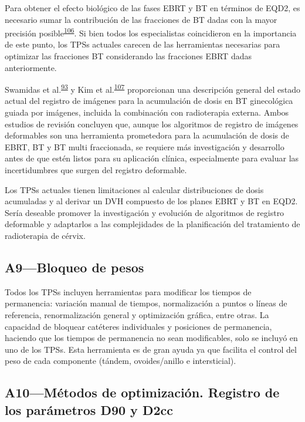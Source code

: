 \documentclass[
  a4paper,
]{scrreprt}
\begin{document}
Para obtener el efecto biológico de las fases EBRT y BT en términos de
EQD2, es necesario sumar la contribución de las fracciones de BT dadas
con la mayor precisión
posible\textsuperscript{\protect\hyperlink{ref-kessler2006}{106}}. Si
bien todos los especialistas coincidieron en la importancia de este
punto, los TPSs actuales carecen de las herramientas necesarias para
optimizar las fracciones BT considerando las fracciones EBRT dadas
anteriormente.

Swamidas et
al.\textsuperscript{\protect\hyperlink{ref-swamidas2020}{93}} y Kim et
al.\textsuperscript{\protect\hyperlink{ref-kim2021}{107}} proporcionan
una descripción general del estado actual del registro de imágenes para
la acumulación de dosis en BT ginecológica guiada por imágenes, incluida
la combinación con radioterapia externa. Ambos estudios de revisión
concluyen que, aunque los algoritmos de registro de imágenes deformables
son una herramienta prometedora para la acumulación de dosis de EBRT, BT
y BT multi fraccionada, se requiere más investigación y desarrollo antes
de que estén listos para su aplicación clínica, especialmente para
evaluar las incertidumbres que surgen del registro deformable.

Los TPSs actuales tienen limitaciones al calcular distribuciones de
dosis acumuladas y al derivar un DVH compuesto de los planes EBRT y BT
en EQD2. Sería deseable promover la investigación y evolución de
algoritmos de registro deformable y adaptarlos a las complejidades de la
planificación del tratamiento de radioterapia de cérvix.

\hypertarget{sec-a9}{%
\subsection{A9---Bloqueo de pesos}\label{sec-a9}}

Todos los TPSs incluyen herramientas para modificar los tiempos de
permanencia: variación manual de tiempos, normalización a puntos o
líneas de referencia, renormalización general y optimización gráfica,
entre otras. La capacidad de bloquear catéteres individuales y
posiciones de permanencia, haciendo que los tiempos de permanencia no
sean modificables, solo se incluyó en uno de los TPSs. Esta herramienta
es de gran ayuda ya que facilita el control del peso de cada componente
(tándem, ovoides/anillo e intersticial).

\hypertarget{sec-a10}{%
\subsection{A10---Métodos de optimización. Registro de los parámetros
D90 y D2cc}\label{sec-a10}}
\end{document}

